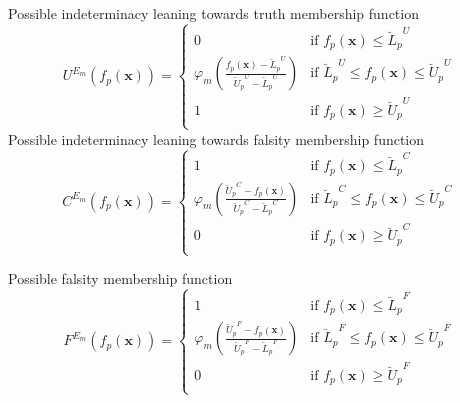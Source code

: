 \documentclass[a4paper]{elsarticle}
\begin{document}
{\noindent Possible indeterminacy leaning towards truth membership function
\begin{equation}
{U^{E_m}}(f_p(\mathbf{x}))=
\left\{
\begin{array}{ll}
      0 & \text{if } f_p(\mathbf{x}) \leq {\breve{L}_p}^{U} \\
      \varphi_m\left(\frac{f_p(\mathbf{x})-{\breve{L}_p}^{U}}{{\breve{U}_p}^{U}-{\breve{L}_p}^{U}}\right) & \text{if } {\breve{L}_p}^{U} \leq f_p(\mathbf{x}) \leq {\breve{U}_p}^{U} \\
      1 & \text{if } f_p(\mathbf{x}) \geq {\breve{U}_p}^{U} \\
\end{array}
\right.
\end{equation}
\noindent Possible indeterminacy leaning towards falsity  membership function
\begin{equation}
{C^{E_m}}(f_p(\mathbf{x}))=
\left\{
\begin{array}{ll}
      1 & \text{if } f_p(\mathbf{x}) \leq {\breve{L}_p}^{C} \\
      \varphi_m\left(\frac{{\breve{U}_p}^{C}-f_p(\mathbf{x})}{{\breve{U}_p}^{C}-{\breve{L}_p}^{C}}\right) & \text{if } {\breve{L}_p}^{C} \leq f_p(\mathbf{x}) \leq {\breve{U}_p}^{C} \\
      0 & \text{if } f_p(\mathbf{x}) \geq {\breve{U}_p}^{C} \\
\end{array}
\right.
\end{equation}

\noindent Possible falsity membership function
\begin{equation}
\label{eq62}
{F^{E_m}}(f_p(\mathbf{x}))=
\left\{
\begin{array}{ll}
      1 & \text{if } f_p(\mathbf{x}) \leq {\breve{L}_p}^{F} \\
      \varphi_m\left(\frac{{\breve{U}_p}^{F}-f_p(\mathbf{x})}{{\breve{U}_p}^{F}-{\breve{L}_p}^{F}}\right) & \text{if } {\breve{L}_p}^{F} \leq f_p(\mathbf{x}) \leq {\breve{U}_p}^{F} \\
      0 & \text{if } f_p(\mathbf{x}) \geq {\breve{U}_p}^{F} \\
\end{array}
\right.
\end{equation}

}
\end{document}
